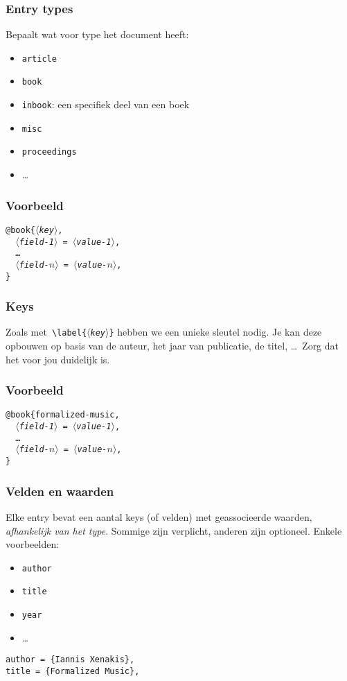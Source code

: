 \begin{frame}
  \frametitle{Entry types}

  Bepaalt wat voor type het document heeft:
  \begin{itemize}
    \item \texttt{article}
    \item \texttt{book}
    \item \texttt{inbook}: een specifiek deel van een boek
    \item \texttt{misc}
    \item \texttt{proceedings}
    \item \ldots
  \end{itemize}
\end{frame}

\begin{frame}
  \frametitle{Voorbeeld}

\texttt{@book\{\textsl{$\langle$key$\rangle$},\\
\ \ \textsl{$\langle$field-1$\rangle$} = \textsl{$\langle$value-1$\rangle$}, \\
\ \ \ldots \\
\ \ \textsl{$\langle$field-$n\rangle$} = \textsl{$\langle$value-$n\rangle$}, \\
\}}
\end{frame}

\begin{frame}
  \frametitle{Keys}

  Zoals met~\texttt{\textcolor{uagreen}{\textbackslash label}\{\textsl{$\langle$key$\rangle$}\}} hebben we een unieke sleutel nodig. Je kan deze opbouwen op basis van de auteur, het jaar van publicatie, de titel, \ldots\ Zorg dat het voor jou duidelijk is.
\end{frame}

\begin{frame}
  \frametitle{Voorbeeld}

\texttt{{@}book\{formalized-music,\\
\ \ \textsl{$\langle$field-1$\rangle$} = \textsl{$\langle$value-1$\rangle$}, \\
\ \ \ldots \\
\ \ \textsl{$\langle$field-$n\rangle$} = \textsl{$\langle$value-$n\rangle$}, \\
\}}
\end{frame}

\begin{frame}[fragile]
  \frametitle{Velden en waarden}

  Elke entry bevat een aantal keys (of velden) met geassocieerde waarden, \emph{afhankelijk van het type}. Sommige zijn verplicht, anderen zijn optioneel. Enkele voorbeelden:
  \begin{itemize}
    \item \texttt{author}
    \item \texttt{title}
    \item \texttt{year}
    \item \ldots
  \end{itemize}
  \verb|author = {Iannis Xenakis},| \\
  \verb|title = {Formalized Music},|
\end{frame}

